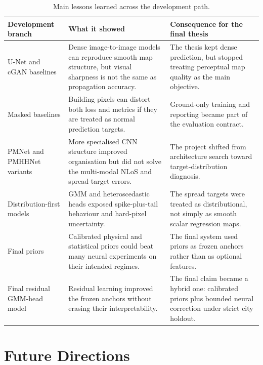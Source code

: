 \begin{table}[htbp]
\centering
\caption{Main lessons learned across the development path.}
\label{tab:conclusion_lessons}
\scriptsize
\renewcommand{\arraystretch}{1.15}
\begin{tabularx}{\textwidth}{>{\raggedright\arraybackslash}p{}
>{\raggedright\arraybackslash}X
>{\raggedright\arraybackslash}X}
\toprule
Development branch & What it showed & Consequence for the final thesis \\
\midrule
U-Net and cGAN baselines &
Dense image-to-image models can reproduce smooth map structure, but visual
sharpness is not the same as propagation accuracy. &
The thesis kept dense prediction, but stopped treating perceptual map quality
as the main objective. \\
Masked baselines &
Building pixels can distort both loss and metrics if they are treated as normal
prediction targets. &
Ground-only training and reporting became part of the evaluation contract. \\
PMNet and PMHHNet variants &
More specialised CNN structure improved organisation but did not solve the
multi-modal NLoS and spread-target errors. &
The project shifted from architecture search toward target-distribution
diagnosis. \\
Distribution-first models &
GMM and heteroscedastic heads exposed spike-plus-tail behaviour and hard-pixel
uncertainty. &
The spread targets were treated as distributional, not simply as smooth scalar
regression maps. \\
Final priors &
Calibrated physical and statistical priors could beat many neural experiments on
their intended regimes. &
The final system used priors as frozen anchors rather than as optional
features. \\
Final residual GMM-head model &
Residual learning improved the frozen anchors without erasing their
interpretability. &
The final claim became a hybrid one: calibrated priors plus bounded neural
correction under strict city holdout. \\
\bottomrule
\end{tabularx}
\end{table}

\section{Future Directions}

